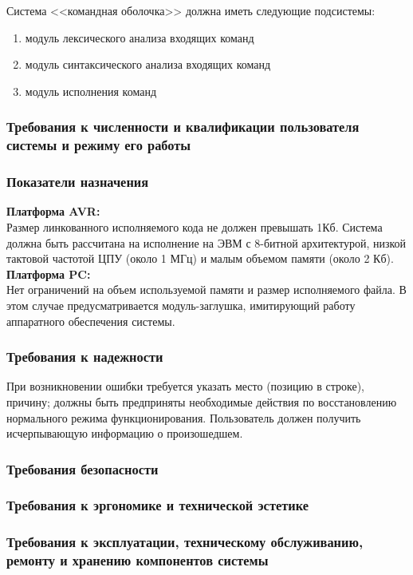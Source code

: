 \documentclass[a4paper, 12pt]{report}
\begin{document}
Система <<командная оболочка>> должна иметь следующие подсистемы:
\begin{enumerate}
	\item модуль лексического анализа входящих команд
	\item модуль синтаксического анализа входящих команд
	\item модуль исполнения команд
\end{enumerate}

\subsubsection{Требования к численности и квалификации пользователя системы и режиму его работы}

\subsubsection{Показатели назначения}
{\bf Платформа AVR:}\\
Размер линкованного исполняемого кода не должен превышать 1Кб. 
Система должна быть рассчитана на 
исполнение на ЭВМ с 8-битной архитектурой, низкой тактовой частотой ЦПУ (около 1 МГц) и малым объемом 
памяти (около 2 Кб). \\
{\bf Платформа PC:}\\
Нет ограничений на объем используемой памяти и размер исполняемого файла. В этом случае предусматривается модуль-заглушка, имитирующий работу аппаратного обеспечения системы.
\subsubsection{Требования к надежности}

При возникновении ошибки требуется указать место (позицию в строке), причину; должны быть предприняты необходимые действия по восстановлению нормального режима функционирования. 
Пользователь должен получить исчерпывающую информацию о произошедшем.

\subsubsection{Требования безопасности}

\subsubsection{Требования к эргономике и технической эстетике}

\subsubsection{Требования к эксплуатации, техническому обслуживанию, ремонту и хранению компонентов системы}
\end{document}
